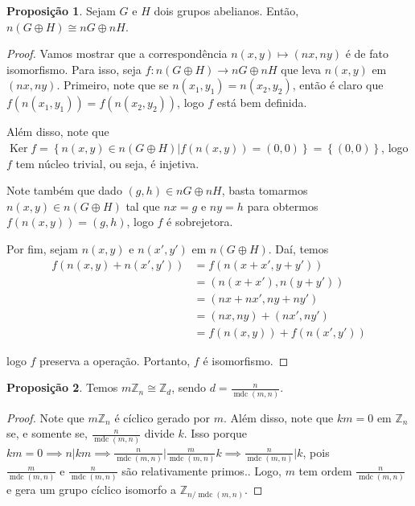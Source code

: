 \documentclass[a4paper,portuguese,11pt,twoside, leqno]{book}
\DeclareMathOperator{\Ker}{Ker}
\DeclareMathOperator{\mdc}{mdc}
\theoremstyle{definition}
\newtheorem{prop}{Proposição}[section]
\begin{document}
	\begin{prop}
		\label{subgrupo abeliano nG}
		Sejam $G$ e $H$ dois grupos abelianos. Então, $n(G\oplus H)\cong nG\oplus nH$.
	\end{prop}
	\begin{proof}
		Vamos mostrar que a correspondência $n(x,y)\mapsto(nx,ny)$ é de fato isomorfismo. Para isso, seja $f: n(G\oplus H)\to nG\oplus nH$ que leva $n(x,y)$ em $(nx,ny)$. Primeiro, note que se $n(x_1,y_1) = n(x_2,y_2)$, então é claro que $f(n(x_1,y_1)) = f(n(x_2,y_2))$, logo $f$ está bem definida.
		\par\vspace{0.3cm} Além disso, note que $\Ker f = \left\{ n(x,y)\in n(G\oplus H)\vert f( n(x,y) ) = (0,0) \right\} = \left\{ (0,0) \right\}$, logo $f$ tem núcleo trivial, ou seja, é injetiva.
		\par\vspace{0.3cm} Note também que dado $(g,h)\in nG\oplus nH$, basta tomarmos $n(x,y)\in n(G\oplus H)$ tal que $nx = g$ e $ny = h$ para obtermos $f(n(x,y)) = (g,h)$, logo $f$ é sobrejetora.
		\par\vspace{0.3cm} Por fim, sejam $n(x,y)$ e $n(x',y')$ em $n(G\oplus H)$. Daí, temos
		\begin{align*}
		f( n(x,y) + n(x',y') ) &= f( n(x+x', y+y') ) \\ &= ( n(x+x'), n(y+y') ) \\ &= (nx + nx', ny + ny') \\ &= (nx, ny) + (nx', ny') \\ &= f(n(x,y)) + f(n(x',y'))
		\end{align*}
		\par\vspace{0.3cm} logo $f$ preserva a operação. Portanto, $f$ é isomorfismo.
	\end{proof}
	\begin{prop}
		\label{regra nG}
		Temos $m\mathbb{Z}_n\cong\mathbb{Z}_d$, sendo $\displaystyle{ d = \frac{n}{\mdc(m,n)} }$.
	\end{prop}
	\begin{proof}
		Note que $m\mathbb{Z}_n$ é cíclico gerado por $m$. Além disso, note que $km = 0$ em $\mathbb{Z}_n$ se, e somente se, $\displaystyle{\frac{n}{\mdc(m,n)}  }$ divide $k$. Isso porque $km = 0\implies n| km\implies \displaystyle{ \frac{n}{\mdc(m,n)}\Bigg| \frac{m}{\mdc(m,n)}k }\implies \displaystyle{ \frac{n}{\mdc(m,n)}\Bigg| k }$, pois $\displaystyle{ \frac{m}{\mdc(m,n)}\text{ e }\frac{n}{\mdc(m,n)}  }$ são relativamente primos.. Logo, $m$ tem ordem $\displaystyle{\frac{n}{\mdc(m,n)}}$ e gera um grupo cíclico isomorfo a $\mathbb{Z}_{n/\mdc(m,n)}$.
	\end{proof}
\end{document}
